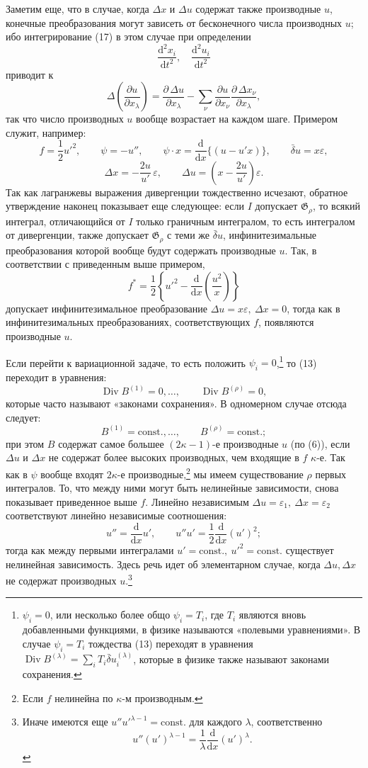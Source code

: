 \documentclass[11pt]{article}
\providecommand{\G}{\mathfrak G}
\providecommand{\eps}{\varepsilon}
\providecommand{\D}{\Delta}
\providecommand{\p}{\partial}
\providecommand{\dd}{\mathrm d}
\DeclareMathOperator{\Div}{Div}
\providecommand{\bd}{\bar{\delta}}
\begin{document}
Заметим еще, что в случае, когда \(\D x\) и \(\D u\) содержат также производные \(u\), конечные преобразования могут зависеть от бесконечного числа производных \(u\); ибо интегрирование (17) в этом случае при определении
\[
\frac{\dd^2x_i}{\dd t^2},\quad \frac{\dd^2u_i}{\dd t^2}
\]
приводит к
\[
\D\!\left(\frac{\p u}{\p x_\lambda}\right)
=\frac{\p\,\D u}{\p x_\lambda}
-\sum_\nu\frac{\p u}{\p x_\nu}
\frac{\p\,\D x_\nu}{\p x_\lambda},
\]
так что число производных \(u\) вообще возрастает на каждом шаге. Примером служит, например:
\[
f=\frac12 u'^2,\qquad
\psi=-u'',\qquad
\psi\cdot x=\frac{\dd}{\dd x}\{(u-u'x)\},\qquad
\bd u=x\eps,
\]
\[
\D x=-\frac{2u}{u'}\,\eps,\qquad
\D u=\left(x-\frac{2u}{u'}\right)\eps.
\]
Так как лагранжевы выражения дивергенции тождественно исчезают, обратное утверждение наконец показывает еще следующее: если \(I\) допускает \(\G_\rho\), то всякий интеграл, отличающийся от \(I\) только граничным интегралом, то есть интегралом от дивергенции, также допускает \(\G_\rho\) с теми же \(\bd u\), инфинитезимальные преобразования которой вообще будут содержать производные \(u\). Так, в соответствии с приведенным выше примером,
\[
f^*=\frac12\left\{u'^2-\frac{\dd}{\dd x}\left(\frac{u^2}{x}\right)\right\}
\]
допускает инфинитезимальное преобразование \(\D u=x\eps,\ \D x=0\), тогда как в инфинитезимальных преобразованиях, соответствующих \(f\), появляются производные \(u\).

Если перейти к вариационной задаче, то есть положить \(\psi_i=0\),\footnote{\(\psi_i=0\), или несколько более общо \(\psi_i=T_i\), где \(T_i\) являются вновь добавленными функциями, в физике называются «полевыми уравнениями». В случае \(\psi_i=T_i\) тождества (13) переходят в уравнения \(\Div B^{(\lambda)}=\sum_i T_i\bd u_i^{(\lambda)}\), которые в физике также называют законами сохранения.} то (13) переходит в уравнения:
\[
\Div B^{(1)}=0,\ldots,\qquad \Div B^{(\rho)}=0,
\]
которые часто называют «законами сохранения». В одномерном случае отсюда следует:
\[
B^{(1)}=\mathrm{const.},\ldots,\qquad B^{(\rho)}=\mathrm{const.};
\]
при этом \(B\) содержат самое большее \((2\kappa-1)\)-е производные \(u\) (по (6)), если \(\D u\) и \(\D x\) не содержат более высоких производных, чем входящие в \(f\) \(\kappa\)-е. Так как в \(\psi\) вообще входят \(2\kappa\)-е производные,\footnote{Если \(f\) нелинейна по \(\kappa\)-м производным.} мы имеем существование \(\rho\) первых интегралов. То, что между ними могут быть нелинейные зависимости, снова показывает приведенное выше \(f\). Линейно независимым \(\D u=\eps_1,\ \D x=\eps_2\) соответствуют линейно независимые соотношения:
\[
u''=\frac{\dd}{\dd x}u',\qquad
u''u'=\frac12\frac{\dd}{\dd x}(u')^2;
\]
тогда как между первыми интегралами \(u'=\mathrm{const.},\ u'^2=\mathrm{const.}\) существует нелинейная зависимость. Здесь речь идет об элементарном случае, когда \(\D u,\D x\) не содержат производных \(u\).\footnote{Иначе имеются еще \(u''u'^{\lambda-1}=\mathrm{const.}\) для каждого \(\lambda\), соответственно
\[
u''(u')^{\lambda-1}=\frac1\lambda\frac{\dd}{\dd x}(u')^\lambda.
\]}
\end{document}
